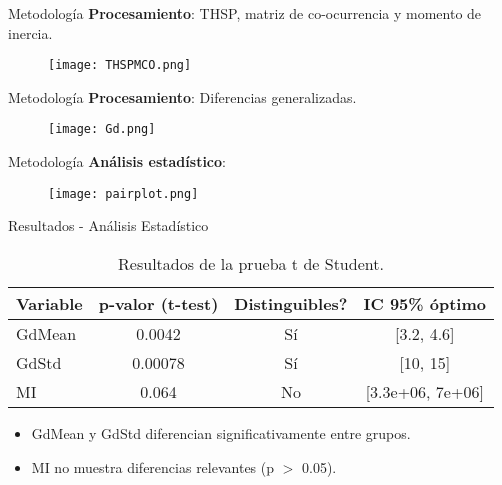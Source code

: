 \documentclass{beamer}
\begin{document}
\begin{frame}{Metodología}
    \textbf{Procesamiento}: THSP, matriz de co-ocurrencia y momento de inercia.
    \begin{figure}
        \texttt{[image: THSPMCO.png]}
    \end{figure}
\end{frame}

\begin{frame}{Metodología}
    \textbf{Procesamiento}: Diferencias generalizadas.
    \begin{figure}
        \texttt{[image: Gd.png]}
    \end{figure}

\end{frame}

\begin{frame}{Metodología}
    \textbf{Análisis estadístico}: 
    \begin{figure}
        \texttt{[image: pairplot.png]}
    \end{figure}

\end{frame}

\begin{frame}{Resultados - Análisis Estadístico}
    \begin{table}
        \centering
        \begin{tabular}{|l|c|c|c|}
            \hline
            \textbf{Variable} & \textbf{p-valor (t-test)} & \textbf{Distinguibles?} & \textbf{IC 95\% óptimo} \\
            \hline
            GdMean & 0.0042 & Sí & [3.2, 4.6] \\
            GdStd & 0.00078 & Sí & [10, 15] \\
            MI & 0.064 & No & [3.3e+06, 7e+06] \\
            \hline
        \end{tabular}
        \caption{Resultados de la prueba t de Student.}
    \end{table}
    \begin{itemize}
        \item GdMean y GdStd diferencian significativamente entre grupos.
        \item MI no muestra diferencias relevantes (p $>$ 0.05).
    \end{itemize}
\end{frame}
\end{document}

